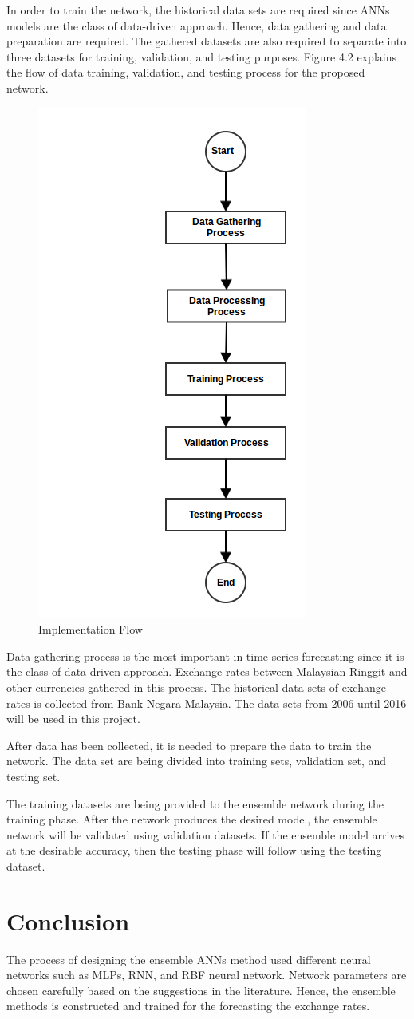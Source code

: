 In order to train the network, the historical data sets are required since ANNs models are the class of data-driven approach. Hence, data gathering and data preparation are required. The gathered datasets are also required to separate into three datasets for training, validation, and testing purposes. Figure 4.2 explains the flow of data training, validation, and testing process for the proposed network.
\begin{figure}[hbt!]\centering
	\includegraphics[width=.5\textwidth]{implementation_flow}
	\caption{Implementation Flow}
\end{figure}

Data gathering process is the most important in time series forecasting since it is the class of data-driven approach. Exchange rates between Malaysian Ringgit and other currencies gathered in this process. The historical data sets of exchange rates is collected from Bank Negara Malaysia. The data sets from 2006 until 2016 will be used in this project. 

After data has been collected, it is needed to prepare the data to train the network. The data set are being  divided into training sets, validation set, and testing set.  

The training datasets are being provided to the ensemble network during the training phase. After the network produces the desired model, the ensemble network will be validated using validation datasets. If the ensemble model arrives at the desirable accuracy, then the testing phase will follow using the testing dataset.
\pagebreak

\section{Conclusion}
The process of designing the ensemble ANNs method used different neural networks such as MLPs, RNN, and RBF neural network. Network parameters are chosen carefully based on the suggestions in the literature. Hence, the ensemble methods is constructed and trained for the forecasting the exchange rates.